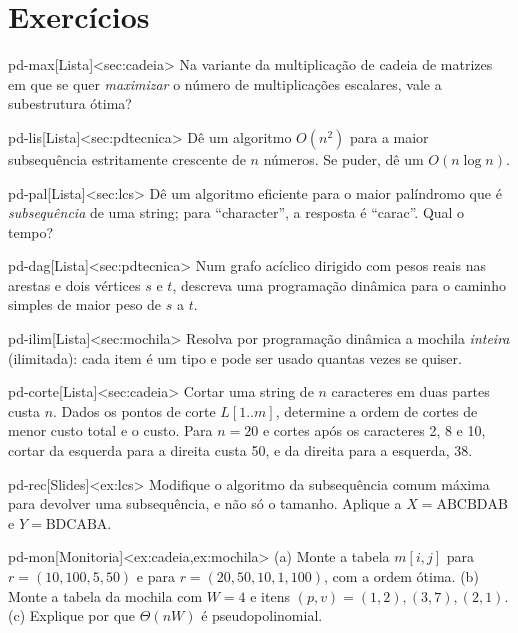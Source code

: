 \section{Exercícios}
\excurso
\begin{exercicio}{pd-max}[Lista]<sec:cadeia>
Na variante da multiplicação de cadeia de matrizes em que se quer \emph{maximizar} o número de multiplicações escalares, vale a subestrutura ótima?
\end{exercicio}
\begin{exercicio}{pd-lis}[Lista]<sec:pdtecnica>
Dê um algoritmo $O(n^2)$ para a maior subsequência estritamente crescente de $n$ números. Se puder, dê um $O(n\log n)$.
\end{exercicio}
\begin{exercicio}{pd-pal}[Lista]<sec:lcs>
Dê um algoritmo eficiente para o maior palíndromo que é \emph{subsequência} de uma string; para ``character'', a resposta é ``carac''. Qual o tempo?
\end{exercicio}
\begin{exercicio}{pd-dag}[Lista]<sec:pdtecnica>
Num grafo acíclico dirigido com pesos reais nas arestas e dois vértices $s$ e $t$, descreva uma programação dinâmica para o caminho simples de maior peso de $s$ a $t$.
\end{exercicio}
\begin{exercicio}{pd-ilim}[Lista]<sec:mochila>
Resolva por programação dinâmica a mochila \emph{inteira} (ilimitada): cada item é um tipo e pode ser usado quantas vezes se quiser.
\end{exercicio}
\begin{exercicio}{pd-corte}[Lista]<sec:cadeia>
Cortar uma string de $n$ caracteres em duas partes custa $n$. Dados os pontos de corte $L[1..m]$, determine a ordem de cortes de menor custo total e o custo. Para $n=20$ e cortes após os caracteres 2, 8 e 10, cortar da esquerda para a direita custa 50, e da direita para a esquerda, 38.
\end{exercicio}
\begin{exercicio}{pd-rec}[Slides]<ex:lcs>
Modifique o algoritmo da subsequência comum máxima para devolver uma subsequência, e não só o tamanho. Aplique a $X=\mathrm{ABCBDAB}$ e $Y=\mathrm{BDCABA}$.
\end{exercicio}
\begin{exercicio}{pd-mon}[Monitoria]<ex:cadeia,ex:mochila>
(a) Monte a tabela $m[i,j]$ para $r=(10,100,5,50)$ e para $r=(20,50,10,1,100)$, com a ordem ótima. (b) Monte a tabela da mochila com $W=4$ e itens $(p,v)=(1,2),(3,7),(2,1)$. (c) Explique por que $\Theta(nW)$ é pseudopolinomial.
\end{exercicio}
